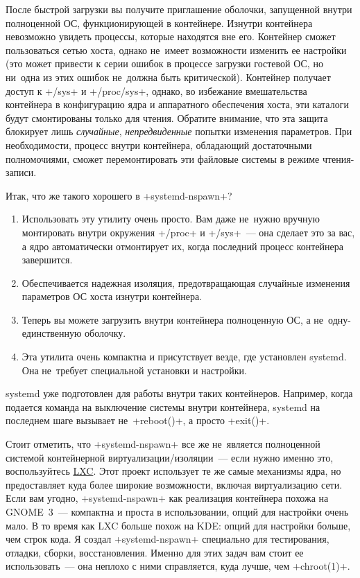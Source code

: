 \documentclass[10pt,oneside,a4paper]{article}
\begin{document}
После быстрой загрузки вы получите приглашение оболочки, запущенной внутри
полноценной ОС, функционирующей в контейнере. Изнутри контейнера невозможно
увидеть процессы, которые находятся вне его. Контейнер сможет пользоваться сетью
хоста, однако не~имеет возможности изменить ее настройки (это может привести к
серии ошибок в процессе загрузки гостевой ОС, но ни~одна из этих ошибок
не~должна быть критической). Контейнер получает доступ к +/sys+ и +/proc/sys+,
однако, во избежание вмешательства контейнера в конфигурацию ядра и аппаратного
обеспечения хоста, эти каталоги будут смонтированы только для чтения. Обратите
внимание, что эта защита блокирует лишь \emph{случайные}, \emph{непредвиденные}
попытки изменения параметров. При необходимости, процесс внутри контейнера,
обладающий достаточными полномочиями, сможет перемонтировать эти файловые
системы в режиме чтения-записи.

Итак, что же такого хорошего в +systemd-nspawn+?
\begin{enumerate}
	\item Использовать эту утилиту очень просто. Вам даже не~нужно вручную монтировать
		внутри окружения +/proc+ и +/sys+~--- она сделает это за вас, а
		ядро автоматически отмонтирует их, когда последний процесс
		контейнера завершится.
	\item Обеспечивается надежная изоляция, предотвращающая случайные
		изменения параметров ОС хоста изнутри контейнера.
	\item Теперь вы можете загрузить внутри контейнера полноценную ОС, а
		не~одну-единственную оболочку.
	\item Эта утилита очень компактна и присутствует везде, где установлен
		systemd. Она не~требует специальной установки и настройки.
\end{enumerate}

systemd уже подготовлен для работы внутри таких контейнеров. Например, когда
подается команда на выключение системы внутри контейнера, systemd на последнем
шаге вызывает не~+reboot()+, а просто +exit()+.

Стоит отметить, что +systemd-nspawn+ все же не~является полноценной системой
контейнерной виртуализации/изоляции~--- если нужно именно это, воспользуйтесь
\href{ http://lxc.sourceforge.net/}{LXC}. Этот проект использует те же самые
механизмы ядра, но предоставляет куда более широкие возможности, включая
виртуализацию сети. Если вам угодно, +systemd-nspawn+ как реализация контейнера
похожа на GNOME~3~--- компактна и проста в использовании, опций для настройки
очень мало. В то время как LXC больше похож на KDE: опций для настройки больше,
чем строк кода. Я создал +systemd-nspawn+ специально для тестирования, отладки,
сборки, восстановления. Именно для этих задач вам стоит ее использовать~--- она
неплохо с ними справляется, куда лучше, чем +chroot(1)+.
\end{document}
